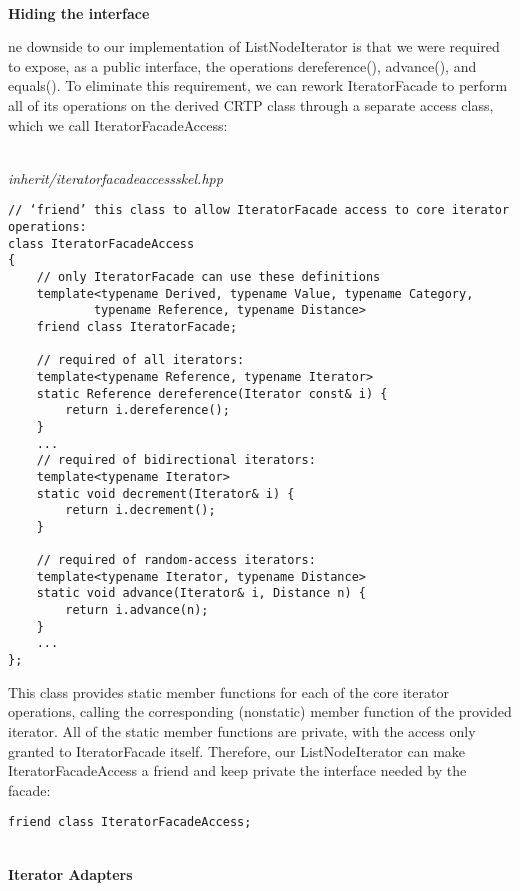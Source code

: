 \hspace*{\fill} \\ %
\noindent
\textbf{Hiding the interface}

ne downside to our implementation of ListNodeIterator is that we were required to expose, as a public interface, the operations dereference(), advance(), and equals(). To eliminate this requirement, we can rework IteratorFacade to perform all of its operations on the derived CRTP class through a separate access class, which we call IteratorFacadeAccess:

\hspace*{\fill} \\ %
\noindent
\textit{inherit/iteratorfacadeaccessskel.hpp}
\begin{lstlisting}[style=styleCXX]
// ‘friend’ this class to allow IteratorFacade access to core iterator operations:
class IteratorFacadeAccess
{
	// only IteratorFacade can use these definitions
	template<typename Derived, typename Value, typename Category,
			typename Reference, typename Distance>
	friend class IteratorFacade;
	
	// required of all iterators:
	template<typename Reference, typename Iterator>
	static Reference dereference(Iterator const& i) {
		return i.dereference();
	}
	...
	// required of bidirectional iterators:
	template<typename Iterator>
	static void decrement(Iterator& i) {
		return i.decrement();
	}

	// required of random-access iterators:
	template<typename Iterator, typename Distance>
	static void advance(Iterator& i, Distance n) {
		return i.advance(n);
	}
	...
};
\end{lstlisting}

This class provides static member functions for each of the core iterator operations, calling the corresponding (nonstatic) member function of the provided iterator. All of the static member functions are private, with the access only granted to IteratorFacade itself. Therefore, our ListNodeIterator can make IteratorFacadeAccess a friend and keep private the interface needed by the facade:

\begin{lstlisting}[style=styleCXX]
friend class IteratorFacadeAccess;
\end{lstlisting}

\hspace*{\fill} \\ %
\noindent
\textbf{Iterator Adapters}


